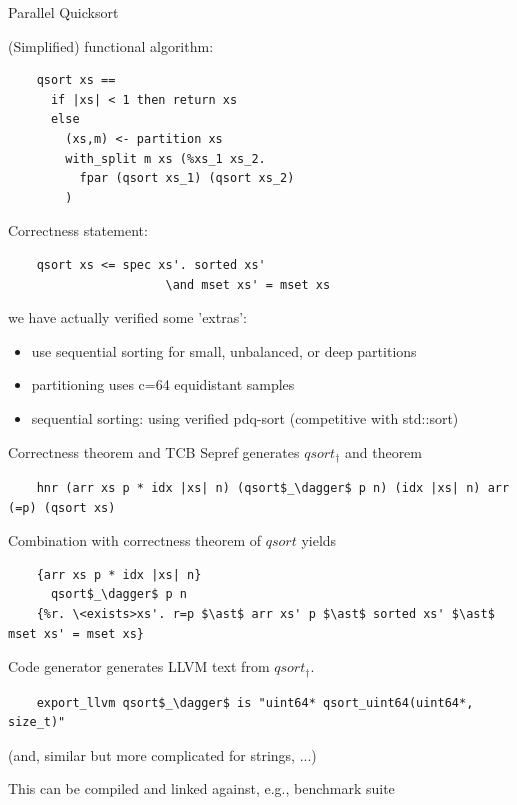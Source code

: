 \documentclass[fleqn]{beamer}
\begin{document}
\begin{frame}[fragile]{Parallel Quicksort}
  \begin{minipage}[t]{.49\textwidth}
  (Simplified) functional algorithm:
  \begin{lstlisting}
    qsort xs ==
      if |xs| < 1 then return xs
      else
        (xs,m) <- partition xs
        with_split m xs (%xs_1 xs_2.
          fpar (qsort xs_1) (qsort xs_2)
        )
  \end{lstlisting}
  \end{minipage}
  \begin{minipage}[t]{.49\textwidth}
  Correctness statement:
  \begin{lstlisting}
    qsort xs <= spec xs'. sorted xs'
                      \and mset xs' = mset xs
  \end{lstlisting}
  \end{minipage}

  \pause
  we have actually verified some 'extras':
  \begin{itemize}
   \item use sequential sorting for small, unbalanced, or deep partitions
   \item partitioning uses c=64 equidistant samples
   \item sequential sorting: using verified pdq-sort (competitive with std::sort)

  \end{itemize}
\end{frame}
\begin{frame}[fragile]{Correctness theorem and TCB}
  Sepref generates $qsort_\dagger$ and theorem

  \begin{lstlisting}
    hnr (arr xs p * idx |xs| n) (qsort$_\dagger$ p n) (idx |xs| n) arr (=p) (qsort xs)
  \end{lstlisting}

  \pause
  Combination with correctness theorem of $qsort$ yields

  \begin{lstlisting}
    {arr xs p * idx |xs| n}
      qsort$_\dagger$ p n
    {%r. \<exists>xs'. r=p $\ast$ arr xs' p $\ast$ sorted xs' $\ast$ mset xs' = mset xs}
  \end{lstlisting}

  \pause
  Code generator generates LLVM text from $qsort_\dagger$.

  \begin{lstlisting}
    export_llvm qsort$_\dagger$ is "uint64* qsort_uint64(uint64*, size_t)"
  \end{lstlisting}
  \vspace*{-.5em}
  (and, similar but more complicated for strings, ...)

  \pause
  \medskip
  This can be compiled and linked against, e.g., benchmark suite


\end{frame}
\end{document}
